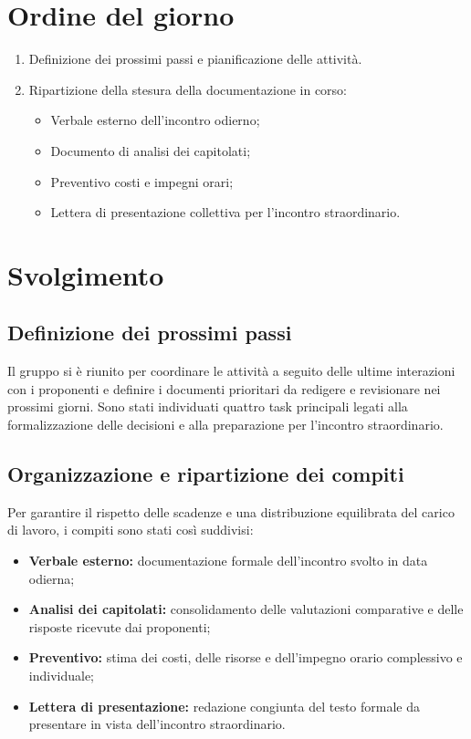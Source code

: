 \documentclass[verbale=interno]{gpt}
\begin{document}
\section{Ordine del giorno}
\begin{enumerate}
  \item Definizione dei prossimi passi e pianificazione delle attività.
  \item Ripartizione della stesura della documentazione in corso:
    \begin{itemize}
      \item Verbale esterno dell'incontro odierno;
      \item Documento di analisi dei capitolati;
      \item Preventivo costi e impegni orari;
      \item Lettera di presentazione collettiva per l'incontro straordinario.
    \end{itemize}
\end{enumerate}
\clearpage
\section{Svolgimento}
\subsection{Definizione dei prossimi passi}
Il gruppo si è riunito per coordinare le attività a seguito delle ultime interazioni con i proponenti e definire i documenti prioritari da redigere e revisionare nei prossimi giorni. Sono stati individuati quattro task principali legati alla formalizzazione delle decisioni e alla preparazione per l'incontro straordinario.

\subsection{Organizzazione e ripartizione dei compiti}
Per garantire il rispetto delle scadenze e una distribuzione equilibrata del carico di lavoro, i compiti sono stati così suddivisi:
\begin{itemize}
  \item \textbf{Verbale esterno:} documentazione formale dell'incontro svolto in data odierna;
  \item \textbf{Analisi dei capitolati:} consolidamento delle valutazioni comparative e delle risposte ricevute dai proponenti;
  \item \textbf{Preventivo:} stima dei costi, delle risorse e dell'impegno orario complessivo e individuale;
  \item \textbf{Lettera di presentazione:} redazione congiunta del testo formale da presentare in vista dell'incontro straordinario.
\end{itemize}
\end{document}
